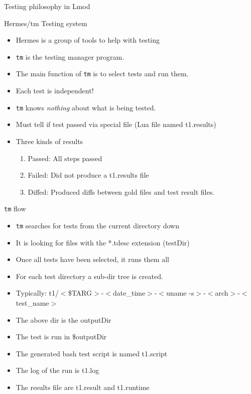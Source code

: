 \documentclass{beamer}
\begin{document}
\begin{rame}{Testing philosophy in Lmod}
\begin{frame}{Hermes/tm Testing system}
  \begin{itemize}
    \item Hermes is a group of tools to help with testing
    \item \texttt{tm} is the testing manager program.
    \item The main function of \texttt{tm} is to select tests and run them.
    \item Each test is independent!
    \item \texttt{tm} knows \emph{nothing} about what is being tested.
    \item Must tell if test passed via special file (Lua file named
      t1.results)
    \item Three kinds of results
      \begin{enumerate}
        \item Passed: All steps passed
        \item Failed: Did not produce a t1.results file
        \item Diffed: Produced diffs between gold files and test
          result files.
      \end{enumerate}
  \end{itemize}
\end{frame}

\begin{frame}{\texttt{tm} flow}
  \begin{itemize}
    \item \texttt{tm} searches for tests from the current directory
      down
    \item It is looking for files with the *.tdesc extension (testDir)
    \item Once all tests have been selected, it runs them all
    \item For each test directory a sub-dir tree is created.
    \item Typically: t1/$<$\$TARG$>$-$<$date\_time$>$-$<$uname
      -s$>$-$<$arch$>$-$<$test\_name$>$
    \item The above dir is the outputDir
    \item The test is run in \$outputDir
    \item The generated bash test script is named {\color{blue} t1.script}
    \item The log of the run is {\color{blue} t1.log}
    \item The results file are {\color{blue} t1.result} and {\color{blue} t1.runtime}
  \end{itemize}
\end{frame}


\end{rame}
\end{document}
